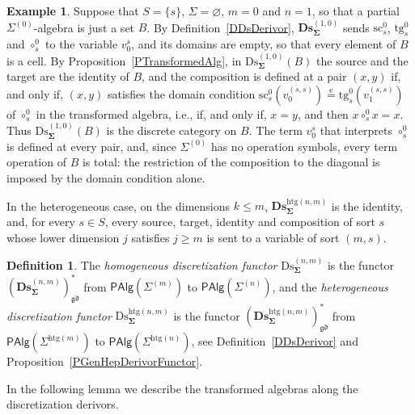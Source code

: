 \documentclass[a4paper, reqno]{amsbook}
\newcommand{\sig}[1]{\mathbf{#1}}             %
\newcommand{\eeq}{\overset{\mathrm e}{=}}      %
\newcommand{\gd}{\mathfrak{gd}}              %
\newcommand{\htg}{\mathrm{htg}}                %
\newcommand{\src}{\mathrm{sc}}
\newcommand{\tgt}{\mathrm{tg}}
\newcommand{\Ds}{\mathrm{Ds}}
\newcommand{\bDs}{\mathbf{Ds}}
\theoremstyle{plain}
\theoremstyle{definition}
\newtheorem{definition}[theorem]{Definition}
\newtheorem{example}[theorem]{Example}
\begin{document}
\begin{example}\label{EDiscretizationDiagonal}
Suppose that $S=\{s\}$, $\Sigma=\varnothing$, $m=0$ and $n=1$, so that a partial $\Sigma^{(0)}$-algebra is just a set $B$.
By Definition~\ref{DDsDerivor}, $\bDs^{(1,0)}_{\sig{\Sigma}}$ sends $\src^{0}_{s}$, $\tgt^{0}_{s}$ and $\circ^{0}_{s}$ to the variable $v^{s}_{0}$, and its domains are empty, so that every element of $B$ is a cell.
By Proposition~\ref{PTransformedAlg}, in $\Ds^{(1,0)}_{\sig{\Sigma}}(B)$ the source and the target are the identity of $B$, and the composition is defined at a pair $(x,y)$ if, and only if, $(x,y)$ satisfies the domain condition $\src^{0}_{s}(v^{(s,s)}_{0})\eeq\tgt^{0}_{s}(v^{(s,s)}_{1})$ of $\circ^{0}_{s}$ in the transformed algebra, i.e., if, and only if, $x=y$, and then $x\circ^{0}_{s}x=x$.
Thus $\Ds^{(1,0)}_{\sig{\Sigma}}(B)$ is the discrete category on $B$.
The term $v^{s}_{0}$ that interprets $\circ^{0}_{s}$ is defined at every pair, and, since $\Sigma^{(0)}$ has no operation symbols, every term operation of $B$ is total: the restriction of the composition to the diagonal is imposed by the domain condition alone.
\end{example}

In the heterogeneous case, on the dimensions $k\leq m$, $\bDs^{\htg(n,m)}_{\sig{\Sigma}}$ is the identity, and, for every $s\in S$, every source, target, identity and composition of sort $s$ whose lower dimension $j$ satisfies $j\geq m$ is sent to a variable of sort $(m,s)$.

\begin{definition}\label{DDsFunctor}
The \emph{homogeneous discretization functor} $\Ds^{(n,m)}_{\sig{\Sigma}}$ is the functor $(\bDs^{(n,m)}_{\sig{\Sigma}})^{\ast}_{\gd}$ from $\mathsf{PAlg}(\Sigma^{(m)})$ to $\mathsf{PAlg}(\Sigma^{(n)})$, and the \emph{heterogeneous discretization functor} $\Ds^{\htg(n,m)}_{\sig{\Sigma}}$ is the functor $(\bDs^{\htg(n,m)}_{\sig{\Sigma}})^{\ast}_{\gd}$ from $\mathsf{PAlg}(\Sigma^{\htg(m)})$ to $\mathsf{PAlg}(\Sigma^{\htg(n)})$, see Definition~\ref{DDsDerivor} and Proposition~\ref{PGenHepDerivorFunctor}.
\end{definition}

In the following lemma we describe the transformed algebras along the discretization derivors.
\end{document}
